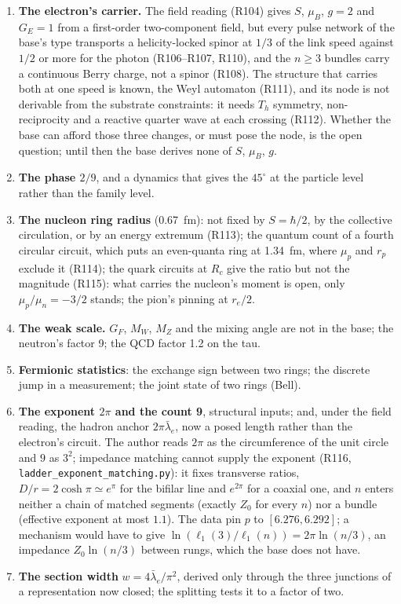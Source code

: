 \documentclass[11pt,a4paper]{article}
\theoremstyle{plain}
\theoremstyle{remark}
\newcommand{\lb}{\ensuremath{\bar\lambda_e}}
\newcommand{\lone}{\ensuremath{\ell_1}}
\begin{document}
\begin{enumerate}[nosep]
\item \textbf{The electron's carrier.} The field reading (R104) gives $S$, $\mu_B$, $g = 2$ and
$G_E = 1$ from a first-order two-component field, but every pulse network of the base's type
transports a helicity-locked spinor at $1/3$ of the link speed against $1/2$ or more for the
photon (R106--R107, R110), and the $n \ge 3$ bundles carry a continuous Berry charge, not a
spinor (R108). The structure that carries both at one speed is known, the Weyl automaton (R111),
and its node is not derivable from the substrate constraints: it needs $T_h$ symmetry,
non-reciprocity and a reactive quarter wave at each crossing (R112). Whether the base can afford
those three changes, or must pose the node, is the open question; until then the base derives
none of $S$, $\mu_B$, $g$.
\item \textbf{The phase $2/9$}, and a dynamics that gives the $45^\circ$ at the particle level
rather than the family level.
\item \textbf{The nucleon ring radius} (0.67~fm): not fixed by $S = \hbar/2$, by the collective
circulation, or by an energy extremum (R113); the quantum count of a fourth circular circuit,
which puts an even-quanta ring at 1.34~fm, where $\mu_p$ and $r_p$ exclude it (R114); the quark
circuits at $R_c$ give the ratio but not the magnitude (R115): what carries the nucleon's moment
is open, only $\mu_p/\mu_n = -3/2$ stands; the pion's pinning at $r_e/2$.
\item \textbf{The weak scale.} $G_F$, $M_W$, $M_Z$ and the mixing angle are not in the base; the
neutron's factor 9; the QCD factor 1.2 on the tau.
\item \textbf{Fermionic statistics}: the exchange sign between two rings; the discrete jump in a
measurement; the joint state of two rings (Bell).
\item \textbf{The exponent $2\pi$ and the count 9}, structural inputs; and, under the field
reading, the hadron anchor $2\pi\lb$, now a posed length rather than the electron's circuit. The
author reads $2\pi$ as the circumference of the unit circle and $9$ as $3^2$; impedance matching
cannot supply the exponent (R116, \texttt{ladder\_exponent\_matching.py}): it fixes transverse
ratios, $D/r = 2\cosh\pi \simeq e^{\pi}$ for the bifilar line and $e^{2\pi}$ for a coaxial one,
and $n$ enters neither a chain of matched segments (exactly $Z_0$ for every $n$) nor a bundle
(effective exponent at most $1.1$). The data pin $p$ to $[6.276, 6.292]$; a mechanism would have to
give $\ln(\lone(3)/\lone(n)) = 2\pi\ln(n/3)$, an impedance $Z_0\ln(n/3)$ between rungs, which the
base does not have.
\item \textbf{The section width} $w = 4\lb/\pi^2$, derived only through the three junctions of a
representation now closed; the splitting tests it to a factor of two.
\end{enumerate}
\end{document}
